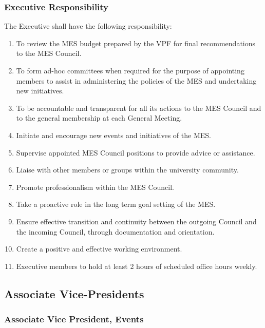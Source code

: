 \hypertarget{executive-responsibility}{%
 \subsubsection{Executive
  Responsibility}
 \label{executive-responsibility}}
The Executive shall have the following responsibility:

\begin{enumerate}
 \item
  To review the MES budget prepared by the VPF for final recommendations
  to the MES Council.
 \item
  To form ad-hoc committees when required for the purpose of appointing
  members to assist in administering the policies of the MES and
  undertaking new initiatives.
 \item
  To be accountable and transparent for all its actions to the MES
  Council and to the general membership at each General Meeting.
 \item
  Initiate and encourage new events and initiatives of the MES.
 \item
  Supervise appointed MES Council positions to provide advice or
  assistance.
 \item
  Liaise with other members or groups within the university community.
 \item
  Promote professionalism within the MES Council.
 \item
  Take a proactive role in the long term goal setting of the MES.
 \item
  Ensure effective transition and continuity between the outgoing
  Council and the incoming Council, through documentation and
  orientation.
 \item
  Create a positive and effective working environment.
 \item
  Executive members to hold at least 2 hours of scheduled office hours
  weekly.

\end{enumerate}

\hypertarget{associate-vice-presidents}{%
 \subsection{Associate
  Vice-Presidents}
 \label{associate-vice-presidents}}

\hypertarget{associate-vice-president-events}{%
 \subsubsection{Associate Vice President,
  Events}
 \label{associate-vice-president-events}}

